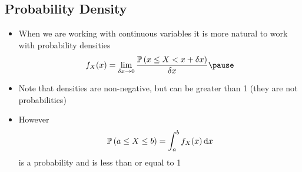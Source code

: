 
\begin{slide}
\section{Probability Density}

\begin{PauseHighLight}
  \begin{itemize}
  \item When we are working with continuous variables it is more natural
    to work with probability densities
    \begin{align*}
      f_X(x) = \lim_{\delta x \rightarrow 0} \frac{\Prob{x\leq X < x +
      \delta x}}{\delta x}\pause
    \end{align*}
  \item Note that densities are non-negative, but can be greater than
    1 (they are not probabilities)\pause
  \item However
    \begin{align*}
      \mathbb{P}\left( a\leq X \leq b \right) = \int_a^b f_X(x)\, \mathrm{d} x
    \end{align*}
  is a probability and is less than or equal to 1\pause
  \end{itemize}
\end{PauseHighLight}

\end{slide}


